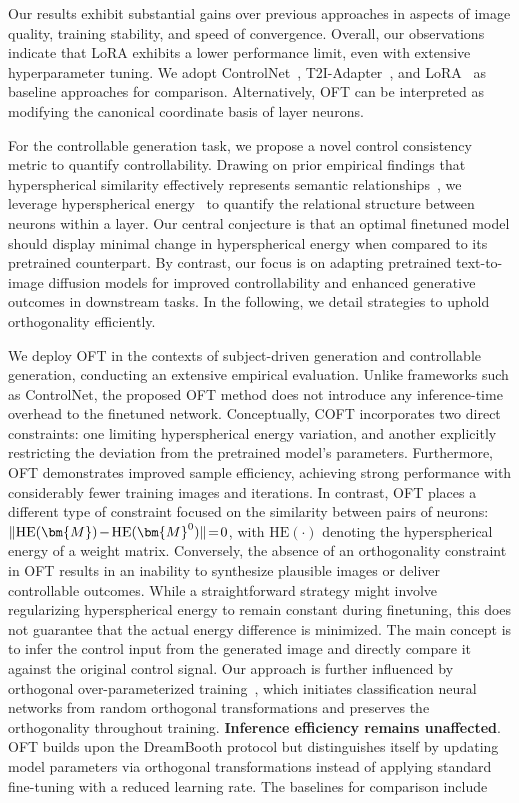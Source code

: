 Our results exhibit substantial gains over previous approaches in aspects of image quality, training stability, and speed of convergence. Overall, our observations indicate that LoRA exhibits a lower performance limit, even with extensive hyperparameter tuning. We adopt ControlNet~\cite{zhang2023adding}, T2I-Adapter~\cite{mou2023t2i}, and LoRA~\cite{hulora2022} as baseline approaches for comparison. Alternatively, OFT can be interpreted as modifying the canonical coordinate basis of layer neurons. \item For the controllable generation task, we propose a novel control consistency metric to quantify controllability. Drawing on prior empirical findings that hyperspherical similarity effectively represents semantic relationships~\cite{liu2017deep,liu2018decoupled,chen2020angular}, we leverage hyperspherical energy~\cite{liu2018learning} to quantify the relational structure between neurons within a layer. Our central conjecture is that an optimal finetuned model should display minimal change in hyperspherical energy when compared to its pretrained counterpart. By contrast, our focus is on adapting pretrained text-to-image diffusion models for improved controllability and enhanced generative outcomes in downstream tasks. In the following, we detail strategies to uphold orthogonality efficiently. \item We deploy OFT in the contexts of subject-driven generation and controllable generation, conducting an extensive empirical evaluation. Unlike frameworks such as ControlNet, the proposed OFT method does not introduce any inference-time overhead to the finetuned network. Conceptually, COFT incorporates two direct constraints: one limiting hyperspherical energy variation, and another explicitly restricting the deviation from the pretrained model’s parameters. Furthermore, OFT demonstrates improved sample efficiency, achieving strong performance with considerably fewer training images and iterations. In contrast, OFT places a different type of constraint focused on the similarity between pairs of neurons: $\thickmuskip=2mu \medmuskip=2mu \| \text{HE}(\bm{M})-\text{HE}(\bm{M}^0) \|=0$, with $\text{HE}(\cdot)$ denoting the hyperspherical energy of a weight matrix. Conversely, the absence of an orthogonality constraint in OFT results in an inability to synthesize plausible images or deliver controllable outcomes. While a straightforward strategy might involve regularizing hyperspherical energy to remain constant during finetuning, this does not guarantee that the actual energy difference is minimized. The main concept is to infer the control input from the generated image and directly compare it against the original control signal. Our approach is further influenced by orthogonal over-parameterized training~\cite{liu2021orthogonal}, which initiates classification neural networks from random orthogonal transformations and preserves the orthogonality throughout training. \textbf{Inference efficiency remains unaffected}. OFT builds upon the DreamBooth protocol but distinguishes itself by updating model parameters via orthogonal transformations instead of applying standard fine-tuning with a reduced learning rate. The baselines for comparison include 